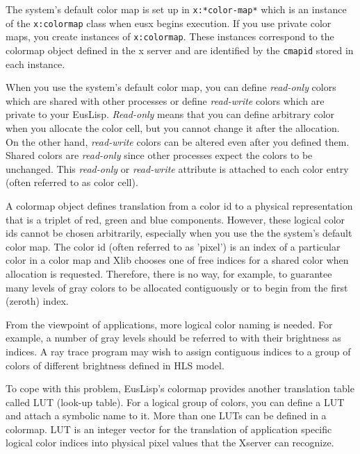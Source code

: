 The system's default color map is set up in {\tt x:*color-map*}
which is an instance of the {\tt x:colormap} class
when eusx begins execution.
If you use private color maps, you create instances of {\tt x:colormap}.
These instances 
correspond to the colormap object defined in the x server and are identified by
the {\tt cmapid}  stored in each instance.

When you use the system's default color map, you can define {\em read-only}
colors which are shared with other processes or define {\em read-write}
colors which are private to your EusLisp.
{\em Read-only} means that you can define arbitrary
color when you allocate the color cell,
but you cannot change it after the allocation.
On the other hand,
{\em read-write} colors can be altered even after you defined them. 
Shared colors are {\em read-only} since other processes expect the colors to be
unchanged.
This {\em read-only} or {\em read-write} attribute is attached to each
color entry (often referred to as color cell).

A colormap object defines translation from a color id to a physical
representation that is a triplet of red, green and blue components.
However, these logical color ids cannot be chosen arbitrarily, especially when
you use the the system's default color map. The color id (often referred
to as 'pixel') is an index of a particular color in a color map and Xlib
chooses one of free indices for a shared color when allocation is requested.
Therefore, there is no way, for example, to  guarantee  many levels of
gray colors to be allocated contiguously or to begin from the first (zeroth)
index.  

From the viewpoint of applications, more logical color naming is needed.
For example,
a number of gray levels should be referred to with their brightness as indices.
A ray trace program may wish to assign contiguous indices to a group of colors
of different brightness defined in HLS model.

To cope with this problem, EusLisp's colormap provides another translation table
called LUT (look-up table). For a logical group of colors, you can define
a LUT and attach a symbolic name to it. More than one LUTs can be defined
in a colormap. 
LUT is an integer vector for the translation of application specific 
logical color indices into physical pixel values that the Xserver can recognize.
 
